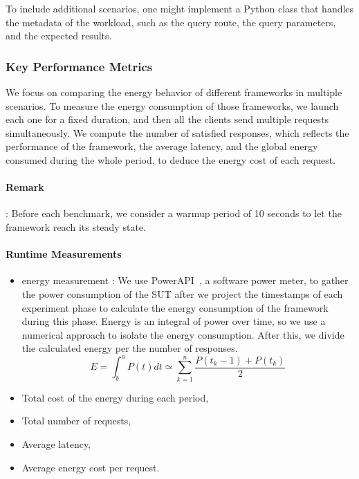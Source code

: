 To include additional scenarios, one might implement a Python class that handles the metadata of the workload, such as the query route, the query parameters, and the expected results.
\subsubsection{Key Performance Metrics}
We focus on comparing the energy behavior of different frameworks in multiple scenarios.
To measure the energy consumption of those frameworks, we launch each one for a fixed duration, and then all the clients send multiple requests simultaneously.
We compute the number of satisfied responses, which reflects the performance of the framework, the average latency, and the global energy consumed during the whole period, to deduce the energy cost of each request.

\paragraph{Remark}:
Before each benchmark, we consider a warmup period of 10 seconds to let the framework reach its steady state.

\paragraph{Runtime Measurements}
\begin{itemize}
    \item energy measurement :
          We use PowerAPI~\cite{bourdon:hal-00772454}, a software power meter, to gather the power consumption of the SUT after we project the timestamps of each experiment phase to calculate the energy consumption of the framework during this phase.
          Energy is an integral of power over time, so we use a numerical approach to isolate the energy consumption.%
          After this, we divide the calculated energy per the number of responses.
          \begin{equation}
              E = \int^a_b P(t)dt \simeq \sum^n_{k=1} \frac{P(t_k-1)+P(t_k)}{2}
          \end{equation}
    \item Total cost of the energy during each period,
    \item Total number of requests,
    \item Average latency,
    \item Average energy cost per request.
\end{itemize}


